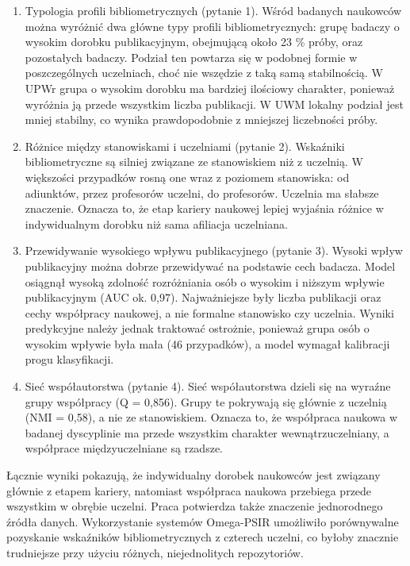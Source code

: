 \documentclass[
  polish,
  12pt,
  a4paper,
]{article}
\providecommand{\tightlist}{%
  \setlength{\itemsep}{0pt}\setlength{\parskip}{0pt}}
\begin{document}
\begin{enumerate}
\def\labelenumi{\arabic{enumi}.}
\tightlist
\item
  Typologia profili bibliometrycznych (pytanie 1). Wśród badanych
  naukowców można wyróżnić dwa główne typy profili bibliometrycznych:
  grupę badaczy o wysokim dorobku publikacyjnym, obejmującą około 23 \%
  próby, oraz pozostałych badaczy. Podział ten powtarza się w podobnej
  formie w poszczególnych uczelniach, choć nie wszędzie z taką samą
  stabilnością. W UPWr grupa o wysokim dorobku ma bardziej ilościowy
  charakter, ponieważ wyróżnia ją przede wszystkim liczba publikacji. W
  UWM lokalny podział jest mniej stabilny, co wynika prawdopodobnie z
  mniejszej liczebności próby.
\item
  Różnice między stanowiskami i uczelniami (pytanie 2). Wskaźniki
  bibliometryczne są silniej związane ze stanowiskiem niż z uczelnią. W
  większości przypadków rosną one wraz z poziomem stanowiska: od
  adiunktów, przez profesorów uczelni, do profesorów. Uczelnia ma
  słabsze znaczenie. Oznacza to, że etap kariery naukowej lepiej
  wyjaśnia różnice w indywidualnym dorobku niż sama afiliacja
  uczelniana.
\item
  Przewidywanie wysokiego wpływu publikacyjnego (pytanie 3). Wysoki
  wpływ publikacyjny można dobrze przewidywać na podstawie cech badacza.
  Model osiągnął wysoką zdolność rozróżniania osób o wysokim i niższym
  wpływie publikacyjnym (AUC ok. 0,97). Najważniejsze były liczba
  publikacji oraz cechy współpracy naukowej, a nie formalne stanowisko
  czy uczelnia. Wyniki predykcyjne należy jednak traktować ostrożnie,
  ponieważ grupa osób o wysokim wpływie była mała (46 przypadków), a
  model wymagał kalibracji progu klasyfikacji.
\item
  Sieć współautorstwa (pytanie 4). Sieć współautorstwa dzieli się na
  wyraźne grupy współpracy (Q = 0,856). Grupy te pokrywają się głównie z
  uczelnią (NMI = 0,58), a nie ze stanowiskiem. Oznacza to, że
  współpraca naukowa w badanej dyscyplinie ma przede wszystkim charakter
  wewnątrzuczelniany, a współprace międzyuczelniane są rzadsze.
\end{enumerate}

Łącznie wyniki pokazują, że indywidualny dorobek naukowców jest związany
głównie z etapem kariery, natomiast współpraca naukowa przebiega przede
wszystkim w obrębie uczelni. Praca potwierdza także znaczenie
jednorodnego źródła danych. Wykorzystanie systemów Omega-PSIR umożliwiło
porównywalne pozyskanie wskaźników bibliometrycznych z czterech uczelni,
co byłoby znacznie trudniejsze przy użyciu różnych, niejednolitych
repozytoriów.
\end{document}
